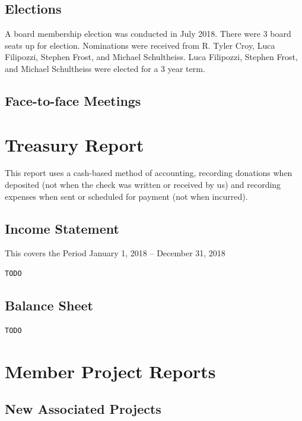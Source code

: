 \documentclass[a4paper]{report}
\begin{document}
\section{Elections}

A board membership election was conducted in July 2018.  There were 3
board seats up for election.  Nominations were received from R. Tyler
Croy, Luca Filipozzi, Stephen Frost, and Michael Schultheiss.  Luca
Filipozzi, Stephen Frost, and Michael Schultheiss were elected for a 3
year term.

\section{Face-to-face Meetings}

\chapter{Treasury Report}

This report uses a cash-based method of accounting, recording donations
when deposited (not when the check was written or received by us) and
recording expenses when sent or scheduled for payment (not when
incurred).

\section{Income Statement}

This covers the Period January 1, 2018 -- December 31, 2018

\begin{verbatim}
TODO
\end{verbatim}

\section{Balance Sheet}

\begin{verbatim}
TODO
\end{verbatim}

\chapter{Member Project Reports}

\section{New Associated Projects}
\end{document}
